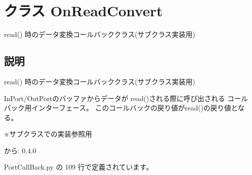 \section{クラス OnReadConvert}
\label{classsource__py_1_1_port_call_back_1_1_on_read_convert}
read() 時のデータ変換コールバッククラス(サブクラス実装用)  




\subsection{説明}
read() 時のデータ変換コールバッククラス(サブクラス実装用) 

InPort/OutPortのバッファからデータが read()される際に呼び出される コールバック用インターフェース。 このコールバックの戻り値がread()の戻り値となる。\par
 ※サブクラスでの実装参照用

\begin{Desc}
\item[から:]0.4.0 \end{Desc}


 PortCallBack.py の 109 行で定義されています。